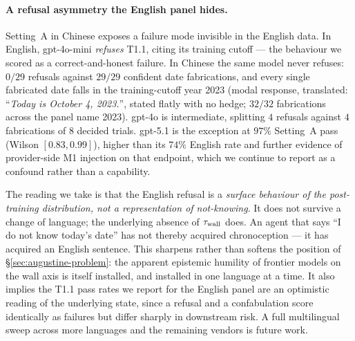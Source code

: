 \paragraph{A refusal asymmetry the English panel hides.}
Setting~A in Chinese exposes a failure mode invisible in the English data. In English, gpt-4o-mini \emph{refuses} T1.1, citing its training cutoff --- the behaviour we scored as a correct-and-honest failure. In Chinese the same model never refuses: $0/29$ refusals against $29/29$ confident date fabrications, and every single fabricated date falls in the training-cutoff year 2023 (modal response, translated: ``\emph{Today is October 4, 2023.}'', stated flatly with no hedge; $32/32$ fabrications across the panel name 2023). gpt-4o is intermediate, splitting $4$ refusals against $4$ fabrications of $8$ decided trials. gpt-5.1 is the exception at $97\%$ Setting~A pass (Wilson $[0.83, 0.99]$), higher than its $74\%$ English rate and further evidence of provider-side M1 injection on that endpoint, which we continue to report as a confound rather than a capability.

The reading we take is that the English refusal is a \emph{surface behaviour of the post-training distribution, not a representation of not-knowing}. It does not survive a change of language; the underlying absence of $\tau_{\mathrm{wall}}$ does. An agent that says ``I do not know today's date'' has not thereby acquired chronoception --- it has acquired an English sentence. This sharpens rather than softens the position of \S\ref{sec:augustine-problem}: the apparent epistemic humility of frontier models on the wall axis is itself installed, and installed in one language at a time. It also implies the T1.1 pass rates we report for the English panel are an optimistic reading of the underlying state, since a refusal and a confabulation score identically as failures but differ sharply in downstream risk. A full multilingual sweep across more languages and the remaining vendors is future work.

